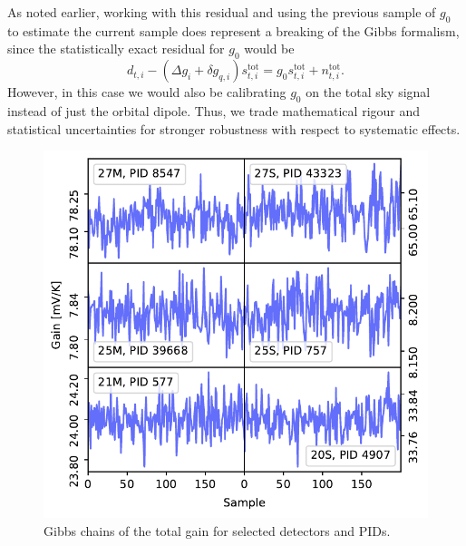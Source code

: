 \documentclass[twocolumn]{aa}
\newcommand{\ti}[0]{_{t, i}}
\newcommand{\qi}[0]{_{q, i}}
\newcommand{\tot}[0]{^{\mathrm{tot}}}
\begin{document}
As noted earlier, working with this residual and using the previous
sample of $g_0$ to estimate the current sample does represent a
breaking of the Gibbs formalism, since the statistically exact
residual for $g_0$ would be
\begin{equation}
    d\ti - (\Delta g_i + \delta g\qi)s\tot\ti = g_0 s\tot\ti + n\ti\tot.
\end{equation}
However, in this case we would also be calibrating $g_0$ on the total
sky signal instead of just the orbital dipole. Thus, we trade
mathematical rigour and statistical uncertainties for stronger
robustness with respect to systematic effects.

\begin{figure}
  \center
  \includegraphics[width=\linewidth]{figs/chains.pdf}
    \caption{Gibbs chains of the total gain for selected detectors and PIDs.}
  \label{fig:chains}
\end{figure}

\end{document}
